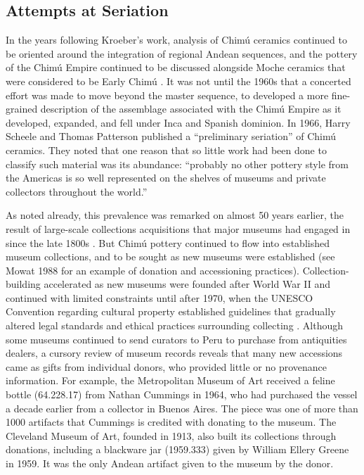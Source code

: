 \documentclass[]{interact}
\theoremstyle{plain}%
\theoremstyle{definition}
\theoremstyle{remark}
\begin{document}
\hypertarget{attempts-at-seriation}{%
\subsection{Attempts at Seriation}\label{attempts-at-seriation}}

In the years following Kroeber's work, analysis of Chimú ceramics
continued to be oriented around the integration of regional Andean
sequences, and the pottery of the Chimú Empire continued to be discussed
alongside Moche ceramics that were considered to be Early Chimú
\citep{RN11156,RN11157}. It was not until the 1960s that a concerted
effort was made to move beyond the master sequence, to developed a more
fine-grained description of the assemblage associated with the Chimú
Empire as it developed, expanded, and fell under Inca and Spanish
dominion. In 1966, Harry Scheele and Thomas Patterson published a
``preliminary seriation'' of Chimú ceramics. They noted
\citep[15]{RN11158} that one reason that so little work had been done to
classify such material was its abundance: ``probably no other pottery
style from the Americas is so well represented on the shelves of museums
and private collectors throughout the world.''

As noted already, this prevalence was remarked on almost 50 years
earlier, the result of large-scale collections acquisitions that major
museums had engaged in since the late 1800s \citep[65-66]{RN11159}. But
Chimú pottery continued to flow into established museum collections, and
to be sought as new museums were established (see Mowat 1988 for an
example of donation and accessioning practices). Collection-building
accelerated as new museums were founded after World War II and continued
with limited constraints until after 1970, when the UNESCO Convention
regarding cultural property established guidelines that gradually
altered legal standards and ethical practices surrounding collecting
\citep{RN11160}. Although some museums continued to send curators to
Peru to purchase from antiquities dealers, a cursory review of museum
records reveals that many new accessions came as gifts from individual
donors, who provided little or no provenance information. For example,
the Metropolitan Museum of Art received a feline bottle (64.228.17) from
Nathan Cummings in 1964, who had purchased the vessel a decade earlier
from a collector in Buenos Aires. The piece was one of more than 1000
artifacts that Cummings is credited with donating to the museum. The
Cleveland Museum of Art, founded in 1913, also built its collections
through donations, including a blackware jar (1959.333) given by William
Ellery Greene in 1959. It was the only Andean artifact given to the
museum by the donor.
\end{document}
